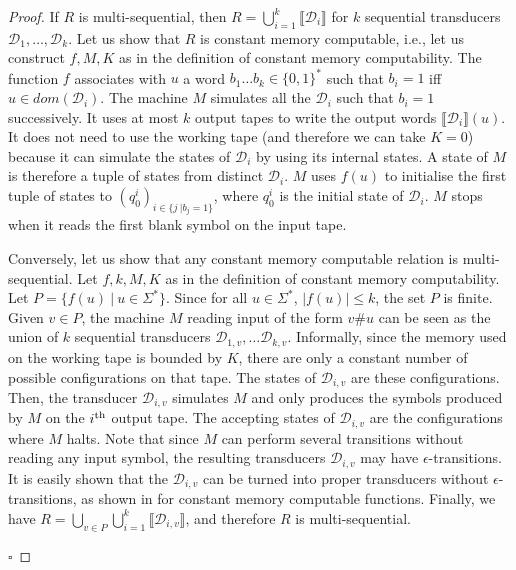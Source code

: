 \documentclass[envcountsame]{llncs}
\newcommand\inter[1]{\llbracket #1 \rrbracket}
\newcommand\eof{\hfill$\square$}
\begin{document}
\begin{proof}
    If $R$ is multi-sequential, then 
    $R = \bigcup_{i=1}^k \inter{\mathcal{D}_i}$ for $k$ sequential
    transducers $\mathcal{D}_1,\dots,\mathcal{D}_k$. Let us show that $R$ is constant
    memory computable, i.e., let us construct $f,M,K$ as in the
    definition of constant memory computability. The function $f$
    associates with $u$ a word $b_1\dots b_k\in \{0,1\}^*$ such that 
    $b_i = 1$ iff $u\in dom(\mathcal{D}_i)$. The machine $M$ 
    simulates all the $\mathcal{D}_i$ such that $b_i = 1$
    successively. It uses at most $k$ output tapes to write 
    the output words $\inter{\mathcal{D}_i}(u)$. It does not need to
    use the working tape (and therefore we can take $K=0$) because it
    can simulate the states of $\mathcal{D}_i$ by using its internal
    states. A state of $M$ is therefore a tuple of states from distinct $\mathcal{D}_i$.
     $M$ uses $f(u)$ to initialise the first tuple of
    states to $(q_0^i)_{i\in \{ j\ |
      b_j=1\}}$, where $q_0^i$ is the initial state of $\mathcal{D}_i$.
     $M$ stops when it reads the first blank symbol on the
    input tape. 

    Conversely, let us show that any constant memory computable
    relation is multi-sequential. Let $f,k,M,K$ as in the definition
    of  constant memory computability. Let $P = \{ f(u)\ |\ u\in
    \Sigma^*\}$. Since for all $u\in\Sigma^*$, $|f(u)|\leq k$, the set
    $P$ is finite. Given $v\in P$, the machine $M$ reading input of
    the form $v\# u$ can be seen as the union of $k$ sequential
    transducers $\mathcal{D}_{1,v},\dots \mathcal{D}_{k,v}$. Informally, since the memory used on the working tape
    is bounded by $K$, there are only a constant number of possible
    configurations on that tape. The states of $\mathcal{D}_{i,v}$ are
    these configurations. Then, the transducer $\mathcal{D}_{i,v}$
    simulates $M$ and only produces the symbols produced by $M$ on the
    $i^{\textup{th}}$ output tape. The accepting states of $\mathcal{D}_{i,v}$ are the
    configurations where $M$ halts. Note that since $M$ can perform
    several transitions without reading any input symbol, the resulting transducers $\mathcal{D}_{i,v}$ may
    have $\epsilon$-transitions. It is easily shown that the
    $\mathcal{D}_{i,v}$ can be turned into proper transducers without
    $\epsilon$-transitions, as shown in
    \cite{DBLP:conf/fsttcs/FiliotGRS11} for constant memory computable
    functions. Finally, we have $R = \bigcup_{v\in P}\bigcup_{i=1}^k
    \inter{\mathcal{D}_{i,v}}$, and therefore $R$ is multi-sequential. 


    \eof
\end{proof}
\end{document}
